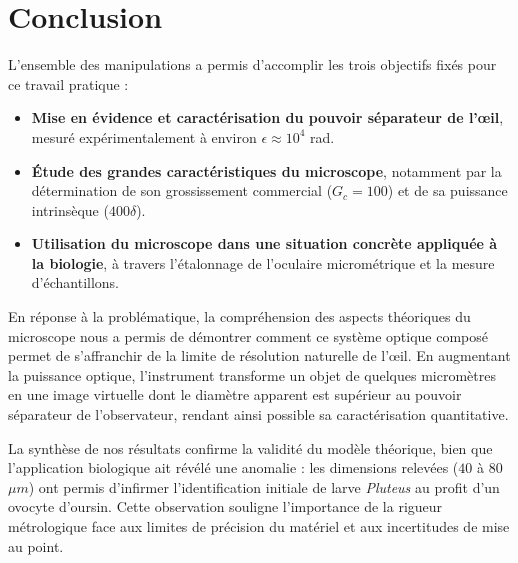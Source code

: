 \section*{Conclusion}

L'ensemble des manipulations a permis d'accomplir les trois objectifs fixés pour ce travail pratique :
\begin{itemize}
    \item \textbf{Mise en évidence et caractérisation du pouvoir séparateur de l'œil}, 
    mesuré expérimentalement à environ $\epsilon \approx 10^4$ rad.
    \item \textbf{Étude des grandes caractéristiques du microscope}, 
    notamment par la détermination de son grossissement commercial ($G_c = 100$)
    et de sa puissance intrinsèque ($400 \delta$).
    \item \textbf{Utilisation du microscope dans une situation concrète appliquée à la biologie}, 
    à travers l'étalonnage de l'oculaire micrométrique et la mesure d'échantillons.
\end{itemize}

En réponse à la problématique, 
la compréhension des aspects théoriques du microscope nous a permis de démontrer 
comment ce système optique composé permet de s'affranchir de la limite de résolution naturelle de l'œil. 
En augmentant la puissance optique, 
l'instrument transforme un objet de quelques micromètres 
en une image virtuelle dont le diamètre apparent est supérieur au pouvoir séparateur de l'observateur, 
rendant ainsi possible sa caractérisation quantitative.

La synthèse de nos résultats confirme la validité du modèle théorique, 
bien que l'application biologique ait révélé une anomalie : 
les dimensions relevées ($40$ à $80$ $\mu m$) ont permis d'infirmer l'identification initiale de larve \textit{Pluteus} 
au profit d'un ovocyte d'oursin. 
Cette observation souligne l'importance de la rigueur métrologique 
face aux limites de précision du matériel et aux incertitudes de mise au point.